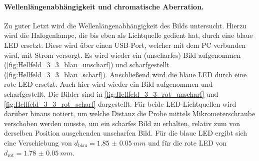 \documentclass[ngerman]{scrartcl}
\begin{document}
\paragraph{Wellenlängenabhängigkeit und chromatische Aberration.}
Zu guter Letzt wird die Wellenlängenabhängigkeit des Bilds untersucht. Hierzu wird die Halogenlampe, die bis eben als Lichtquelle gedient hat, durch eine blaue LED ersetzt. Diese wird über einen USB-Port, welcher mit dem PC verbunden wird, mit Strom versorgt. Es wird wieder ein (unscharfes) Bild aufgenommen (\autoref{fig:Hellfeld_3_3_blau_unscharf}) und scharfgestellt (\autoref{fig:Hellfeld_3_3_blau_scharf}). Anschließend wird die blaue LED durch eine rote LED ersetzt. Auch hier wird wieder ein Bild aufgenommen und scharfgestellt. Die Bilder sind in \autoref{fig:Hellfeld_3_3_rot_unscharf} und \autoref{fig:Hellfeld_3_3_rot_scharf} dargestellt. Für beide LED-Lichtquellen wird darüber hinaus notiert, um welche Distanz die Probe mittels Mikrometerschraube verschoben werden musste, um ein scharfes Bild zu erhalten, relativ zum von derselben Position ausgehenden unscharfen Bild. Für die blaue LED ergibt sich eine Verschiebung von $d_{\text{blau}}=\SI{1.85(5)}{mm}$ und für die rote LED von $d_{\text{rot}}=\SI{1.78(5)}{mm}$.
%
\setcapindent{0pt}
\end{document}

